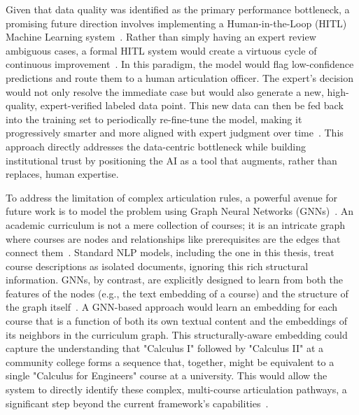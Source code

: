 Given that data quality was identified as the primary performance bottleneck, a promising future direction involves implementing a Human-in-the-Loop (HITL) Machine Learning system~\cite{WU2022364}. Rather than simply having an expert review ambiguous cases, a formal HITL system would create a virtuous cycle of continuous improvement~\cite{10.5555/3061053.3061219,wang2019}. In this paradigm, the model would flag low-confidence predictions and route them to a human articulation officer. The expert's decision would not only resolve the immediate case but would also generate a new, high-quality, expert-verified labeled data point. This new data can then be fed back into the training set to periodically re-fine-tune the model, making it progressively smarter and more aligned with expert judgment over time~\cite{Settles2009ActiveLL,wang2022humanintheloopmachinelearningmacromicro}. This approach directly addresses the data-centric bottleneck while building institutional trust by positioning the AI as a tool that augments, rather than replaces, human expertise.

To address the limitation of complex articulation rules, a powerful avenue for future work is to model the problem using Graph Neural Networks (GNNs)~\cite{kipf2017semisupervisedclassificationgraphconvolutional, hamilton2018inductiverepresentationlearninglarge}. An academic curriculum is not a mere collection of courses; it is an intricate graph where courses are nodes and relationships like prerequisites are the edges that connect them~\cite{zhang2023curriculum, wang2025generativecontrastiveheterogeneousgraphneural}. Standard NLP models, including the one in this thesis, treat course descriptions as isolated documents, ignoring this rich structural information. GNNs, by contrast, are explicitly designed to learn from both the features of the nodes (e.g., the text embedding of a course) and the structure of the graph itself~\cite{veličković2018graphattentionnetworks, s23084168}. A GNN-based approach would learn an embedding for each course that is a function of both its own textual content and the embeddings of its neighbors in the curriculum graph. This structurally-aware embedding could capture the understanding that "Calculus I" followed by "Calculus II" at a community college forms a sequence that, together, might be equivalent to a single "Calculus for Engineers" course at a university. This would allow the system to directly identify these complex, multi-course articulation pathways, a significant step beyond the current framework's capabilities~\cite{Yan_2024, zhang2023curriculum}.

